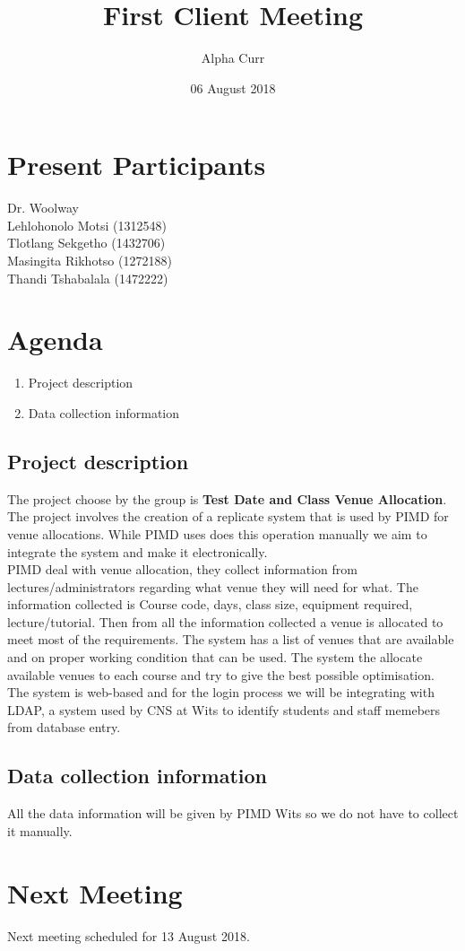 \documentclass[11pt]{article}
\title{First Client Meeting}
\author{Alpha Curr}
\date{06 August 2018}
\begin{document}
\maketitle

\section{Present Participants}
Dr. Woolway \\
Lehlohonolo Motsi (1312548)\\
Tlotlang Sekgetho (1432706)\\
Masingita Rikhotso (1272188)\\
Thandi Tshabalala (1472222)

\section{Agenda}
\begin{enumerate}
\item Project description
\item Data collection information
\end{enumerate}

\subsection{Project description}
The project choose by the group is \textbf{Test Date and Class Venue Allocation}.\\
The project involves the creation of a replicate system that is used by PIMD for venue allocations. While PIMD uses does this operation manually we aim to integrate the system and make it electronically.\\
\newline
PIMD deal with venue allocation, they collect information from lectures/administrators regarding what venue they will need for what. The information collected is Course code, days, class size, equipment required, lecture/tutorial. Then from all the information collected a venue is allocated to meet most of the requirements. The system has a list of venues that are available and on proper working condition that can be used. The system the allocate available venues to each course and try to give the best possible optimisation.\\
The system is web-based and for the login process we will be integrating with LDAP, a system used by CNS at Wits to identify students and staff memebers from database entry.

\subsection{Data collection information}
All the data information will be given by PIMD Wits so we do not have to collect it manually.

\section{Next Meeting}
Next meeting scheduled for 13 August 2018.
\end{document}
